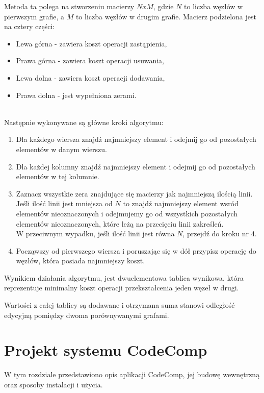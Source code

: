 \documentclass[a4paper,12pt,twoside]{article}
\begin{document}
Metoda ta polega na stworzeniu macierzy $NxM$, gdzie $N$ to liczba węzłów w pierwszym grafie, a $M$ to liczba węzłów w drugim grafie. Macierz podzielona jest na cztery części:
\begin{itemize}
\item Lewa górna - zawiera koszt operacji zastąpienia,
\item Prawa górna - zawiera koszt operacji usuwania,
\item Lewa dolna - zawiera koszt operacji dodawania,
\item Prawa dolna - jest wypełniona zerami.
\end{itemize}
\\
Następnie wykonywane są główne kroki algorytmu:
\begin{enumerate}
\item Dla każdego wiersza znajdź najmniejszy element i odejmij go od pozostałych elementów w danym wierszu.
\item Dla każdej kolumny znajdź najmniejszy element i odejmij go od pozostałych elementów w tej kolumnie.
\item Zaznacz wszystkie zera znajdujące się macierzy jak najmniejszą ilością linii. \\
Jeśli ilość linii jest mniejsza od $N$ to znajdź najmniejszy element wsród elementów nieoznaczonych i odejmujemy go od wszystkich pozostałych elementów nieoznaczonych, które leżą na przecięciu linii zakreśleń. \\
W przeciwnym wypadku, jeśli ilość linii jest równa $N$, przejdź do kroku nr 4.
\item Począwszy od pierwszego wiersza i poruszając się w dół przypisz operację do węzłów, która posiada najmniejszy koszt.
\end{enumerate}

Wynikiem działania algorytmu, jest dwuelementowa tablica wynikowa, która reprezentuje minimalny koszt operacji przekształcenia jeden węzeł w drugi.

Wartości z całej tablicy są dodawane i otrzymana suma stanowi odległość edycyjną pomiędzy dwoma porównywanymi grafami.

\newpage

\section{Projekt systemu CodeComp}

W tym rozdziale przedstawiono opis aplikacji CodeComp, jej budowę wewnętrzną oraz sposoby instalacji i użycia.
\end{document}
